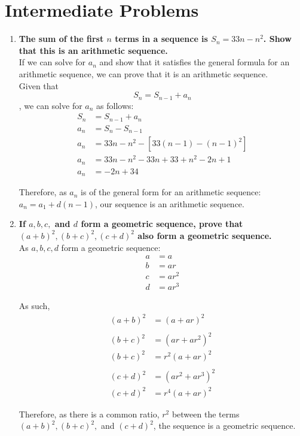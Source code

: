 \documentclass[12pt]{article}
\begin{document}
\section*{Intermediate Problems}
\begin{enumerate}
    \item \textbf{The sum of the first $n$ terms in a sequence is $S_n = 33n - n^2$. Show that this is an arithmetic sequence.} \\
    
    If we can solve for $a_n$ and show that it satisfies the general formula for an arithmetic sequence, we can prove that it is an arithmetic sequence. \\
    
    Given that $$S_n = S_{n - 1} + a_n$$, we can solve for $a_{n}$ as follows:
    \begin{align*}
        S_n & = S_{n - 1} + a_n \\
        a_n & = S_{n} - S_{n - 1} \\
        a_n & = 33n - n^2 - [33(n - 1) - (n - 1)^2] \\
        a_n & = 33n - n^2 - 33n + 33 + n^2 - 2n + 1 \\
        a_n & = -2n + 34
    \end{align*}
    
    Therefore, as $a_n$ is of the general form for an arithmetic sequence: $a_n = a_1 + d(n - 1)$, our sequence is an arithmetic sequence. 
    
    \item \textbf{If $a, b, c,$ and $d$ form a geometric sequence, prove that $(a + b)^2, (b + c)^2, (c + d)^2$ also form a geometric sequence.} \\
    
    As $a, b, c, d$ form a geometric sequence:
    \begin{align*}
        a & = a \\
        b & = ar \\
        c & = ar^2 \\
        d & = ar^3
    \end{align*}
    
    As such,
    \begin{align*}
        (a + b)^2 & = (a + ar)^2 \\ \\
        (b + c)^2 & = (ar + ar^2)^2 \\
        (b + c)^2 & = r^2(a + ar)^2 \\ \\
        (c + d)^2 & = (ar^2 + ar^3)^2 \\
        (c + d)^2 & = r^4(a + ar)^2
    \end{align*}
    
    Therefore, as there is a common ratio, $r^2$ between the terms $(a + b)^2, (b + c)^2,$ and $(c + d)^2$, the sequence is a geometric sequence.
    
\end{enumerate}
\end{document}
